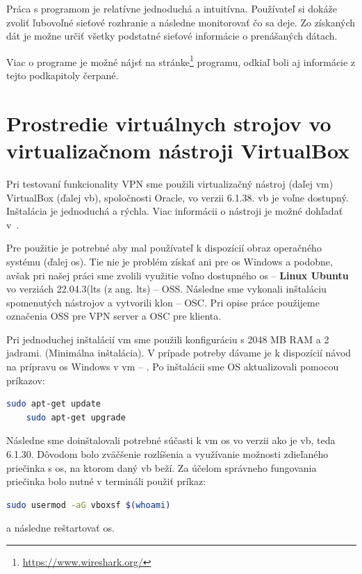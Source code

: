 Práca s programom je relatívne jednoduchá a intuitívna. Používateľ si dokáže zvoliť ľubovoľné sieťové rozhranie a následne monitorovať čo sa deje. Zo získaných dát je možne určiť všetky podstatné sieťové informácie o prenášaných dátach.

Viac o programe je možné nájsť na stránke\footnote{\url{https://www.wireshark.org/}} programu, odkiaľ boli aj informácie z tejto podkapitoly čerpané. 

\section{Prostredie virtuálnych strojov vo virtualizačnom nástroji VirtualBox}\label{merania}
Pri testovaní funkcionality VPN sme použili virtualizačný nástroj (daľej \acrshort{vm}) VirtualBox (ďalej \acrshort{vb}), spoločnosti Oracle, vo verzii 6.1.38. \acrshort{vb} je voľne dostupný. Inštalácia je jednoduchá a rýchla. Viac informácii o nástroji je možné dohľadať v~\cite{vbox}.

Pre použitie je potrebné aby mal používateľ k dispozícií obraz operačného systému (ďalej \acrshort{os}). Tie nie je problém získať ani pre \acrshort{os} Windows a podobne, avšak pri našej práci sme zvolili využitie voľno dostupného  \acrshort{os} -- \textbf{Linux Ubuntu} vo verziách 22.04.3(\acrshort{lts} (z ang. \acrlong{lts}) -- OSS. Následne sme vykonali inštaláciu spomenutých nástrojov a vytvorili klon -- OSC. Pri opise práce použijeme označenia OSS pre VPN server a OSC pre klienta.

Pri jednoduchej inštalácií \acrshort{vm} sme použili konfiguráciu s  2048 MB RAM a 2 jadrami. (Minimálna inštalácia). V prípade potreby dávame je k dispozícií návod na prípravu \acrshort{os} Windows v \acrshort{vm} -- \cite{vmkonfig}. Po inštalácii sme OS aktualizovali pomocou príkazov:
\begin{lstlisting}[language=bash]
	sudo apt-get update
	sudo apt-get upgrade
\end{lstlisting}
Následne sme doinštalovali potrebné súčasti k \acrshort{vm} \acrshort{os} vo verzii ako je \acrshort{vb}, teda 6.1.30. Dôvodom bolo zväčšenie rozlíšenia a využívanie možnosti zdieľaného priečinka s \acrshort{os}, na ktorom daný \acrshort{vb} beží. Za účelom správneho fungovania priečinka bolo nutné v termináli použiť príkaz:
\begin{lstlisting}[language=bash]
	sudo usermod -aG vboxsf $(whoami)
\end{lstlisting}
a následne reštartovať \acrshort{os}.

